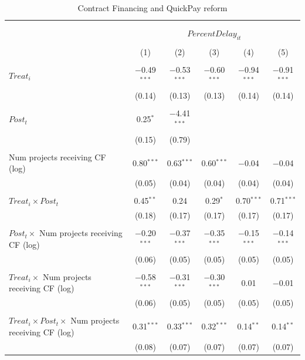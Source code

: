 \documentclass[
]{article}
\begin{document}
\begin{table}[H] \centering 
  \caption{Contract Financing and QuickPay reform} 
  \label{} 
\small 
\begin{tabular}{@{\extracolsep{-2pt}}lccccc} 
\\[-1.8ex]\hline 
\hline \\[-1.8ex] 
\\[-1.8ex] & \multicolumn{5}{c}{$PercentDelay_{it}$  } \\ 
\\[-1.8ex] & (1) & (2) & (3) & (4) & (5)\\ 
\hline \\[-1.8ex] 
 $Treat_i$ & $-$0.49$^{***}$ & $-$0.53$^{***}$ & $-$0.60$^{***}$ & $-$0.94$^{***}$ & $-$0.91$^{***}$ \\ 
  & (0.14) & (0.13) & (0.13) & (0.14) & (0.14) \\ 
  & & & & & \\ 
 $Post_t$ & 0.25$^{*}$ & $-$4.41$^{***}$ &  &  &  \\ 
  & (0.15) & (0.79) &  &  &  \\ 
  & & & & & \\ 
 Num projects receiving CF (log) & 0.80$^{***}$ & 0.63$^{***}$ & 0.60$^{***}$ & $-$0.04 & $-$0.04 \\ 
  & (0.05) & (0.04) & (0.04) & (0.04) & (0.04) \\ 
  & & & & & \\ 
 $Treat_i \times Post_t$ & 0.45$^{**}$ & 0.24 & 0.29$^{*}$ & 0.70$^{***}$ & 0.71$^{***}$ \\ 
  & (0.18) & (0.17) & (0.17) & (0.17) & (0.17) \\ 
  & & & & & \\ 
 $Post_t \times $ Num projects receiving CF (log) & $-$0.20$^{***}$ & $-$0.37$^{***}$ & $-$0.35$^{***}$ & $-$0.15$^{***}$ & $-$0.14$^{***}$ \\ 
  & (0.06) & (0.05) & (0.05) & (0.05) & (0.05) \\ 
  & & & & & \\ 
 $Treat_i \times $ Num projects receiving CF (log) & $-$0.58$^{***}$ & $-$0.31$^{***}$ & $-$0.30$^{***}$ & 0.01 & $-$0.01 \\ 
  & (0.06) & (0.05) & (0.05) & (0.05) & (0.05) \\ 
  & & & & & \\ 
 $Treat_i \times Post_t \times $ Num projects receiving CF (log) & 0.31$^{***}$ & 0.33$^{***}$ & 0.32$^{***}$ & 0.14$^{**}$ & 0.14$^{**}$ \\ 
  & (0.08) & (0.07) & (0.07) & (0.07) & (0.07) \\ 

\end{tabular}
\end{table}
\end{document}
